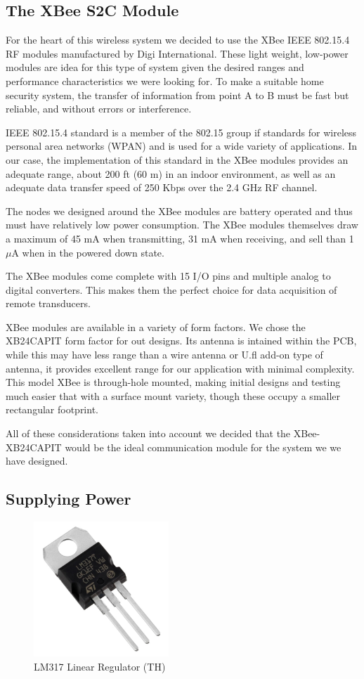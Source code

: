\documentclass[a4paper,11pt]{report}
\begin{document}
		\subsection{The XBee S2C Module}
		\par For the heart of this wireless system we decided to use the XBee IEEE 802.15.4 RF modules manufactured by Digi International. These light weight, low-power modules are idea for this type of system given the desired ranges and performance characteristics we were looking for. To make a suitable home security system, the transfer of information from point A to B must be fast but reliable, and without errors or interference. \par IEEE 802.15.4 standard is a member of the 802.15 group if standards for wireless personal area networks (WPAN) and is used for a wide variety of applications. In our case, the implementation of this standard in the XBee modules provides an adequate range, about 200 ft (60 m) in an indoor environment, as well as an adequate data transfer speed of 250 Kbps over the 2.4 GHz RF channel.     
		\par The nodes we designed around the XBee modules are battery operated and thus must have relatively low power consumption. The XBee modules themselves draw a maximum of 45 mA when transmitting, 31 mA when receiving, and sell than 1 $\mu$A when in the powered down state. 
		\par The XBee modules come complete with 15 I/O pins and multiple analog to digital converters. This makes them the perfect choice for data acquisition of remote transducers. 
		\par XBee modules are available in a variety of form factors. We chose the XB24CAPIT form factor for out designs. Its antenna is intained within the PCB, while this may have less range than a wire antenna or U.fl add-on type of antenna, it provides excellent range for our application with minimal complexity. This model XBee is through-hole mounted, making initial designs and testing much easier that with a surface mount variety, though these occupy a smaller rectangular footprint. 
		\par All of these considerations taken into account we decided that the XBee-XB24CAPIT would be the ideal communication module for the system we we have designed. \\
		
		\subsection{Supplying Power}
			\begin{figure}
				\includegraphics[width=2in]{lm317.jpg}
				\caption{\small LM317 Linear Regulator (TH)}
			\end{figure}
\end{document}
